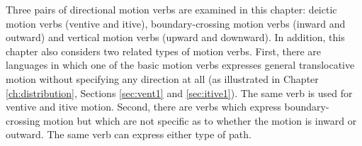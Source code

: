 
%
%

Three pairs of directional motion verbs are examined in this chapter: deictic motion verbs (ventive and itive), boundary-crossing motion verbs (inward and outward) and vertical motion verbs (upward and downward). In addition, this chapter also considers two related types of motion verbs. First, there are languages in which one of the basic motion verbs expresses general translocative motion without specifying any direction at all (as illustrated in Chapter \ref{ch:distribution}, Sections \ref{sec:vent1} and \ref{sec:itive1}). The same verb is used for ventive and itive motion. Second, there are verbs which express boundary-crossing motion but which are not specific as to whether the motion is inward or outward. The same verb can express either type of path.  


